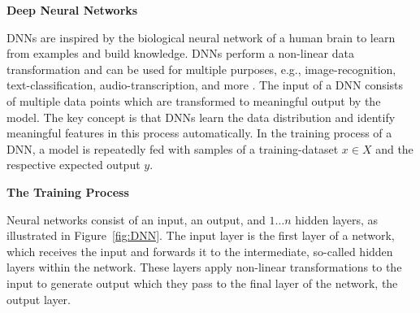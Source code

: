 \textbf{Deep Neural Networks}

DNNs are inspired by the biological neural network of a human brain to learn from examples and build knowledge. 
DNNs perform a non-linear data transformation and can be used for multiple purposes, e.g., image-recognition, text-classification, audio-transcription, and more \cite{rawat2017deep}.
The input of a DNN consists of multiple data points which are transformed to meaningful output by the model. The key concept is that DNNs learn the data distribution and identify meaningful features in this process automatically.
In the training process of a DNN, a model is repeatedly fed with samples of a training-dataset $x \in X$ and the respective expected output $y$.

\textbf{The Training Process}

Neural networks consist of an input, an output, and $1\dots n$ hidden layers, as illustrated in Figure~\ref{fig:DNN}.
The input layer is the first layer of a network, which receives the input and forwards it to the intermediate, so-called hidden layers within the network. These layers apply non-linear transformations to the input to generate output which they pass to the final layer of the network, the output layer. 
